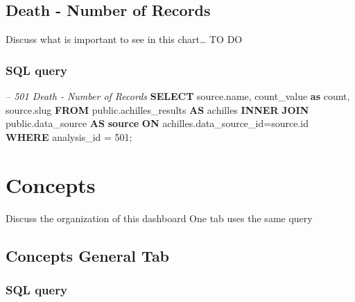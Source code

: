 \documentclass[]{book}
\newenvironment{Shaded}{\begin{snugshade}}{\end{snugshade}}
\newcommand{\KeywordTok}[1]{\textcolor[rgb]{0.13,0.29,0.53}{\textbf{#1}}}
\newcommand{\DecValTok}[1]{\textcolor[rgb]{0.00,0.00,0.81}{#1}}
\newcommand{\CommentTok}[1]{\textcolor[rgb]{0.56,0.35,0.01}{\textit{#1}}}
\newcommand{\FunctionTok}[1]{\textcolor[rgb]{0.00,0.00,0.00}{#1}}
\newcommand{\NormalTok}[1]{#1}
\begin{document}
\section{Death - Number of Records}\label{death---number-of-records}

Discuss what is important to see in this chart\ldots{} TO DO

\subsection{SQL query}\label{sql-query-15}

\begin{Shaded}
\begin{Highlighting}[]
\CommentTok{-- 501  Death - Number of Records}
\KeywordTok{SELECT}\NormalTok{ source.name,}
\NormalTok{    count_value }\KeywordTok{as} \FunctionTok{count}\NormalTok{, }
\NormalTok{    source.slug}
\KeywordTok{FROM}\NormalTok{ public.achilles_results }\KeywordTok{AS}\NormalTok{ achilles }\KeywordTok{INNER} \KeywordTok{JOIN} 
\NormalTok{    public.data_source }\KeywordTok{AS} \KeywordTok{source} \KeywordTok{ON}\NormalTok{ achilles.data_source_id=source.id}
\KeywordTok{WHERE}\NormalTok{ analysis_id = }\DecValTok{501}\NormalTok{;}
\end{Highlighting}
\end{Shaded}

\chapter{Concepts}\label{concepts}

Discuss the organization of this dashboard One tab uses the same query

\section{Concepts General Tab}\label{concepts-general-tab}

\subsection{SQL query}\label{sql-query-16}
\end{document}
